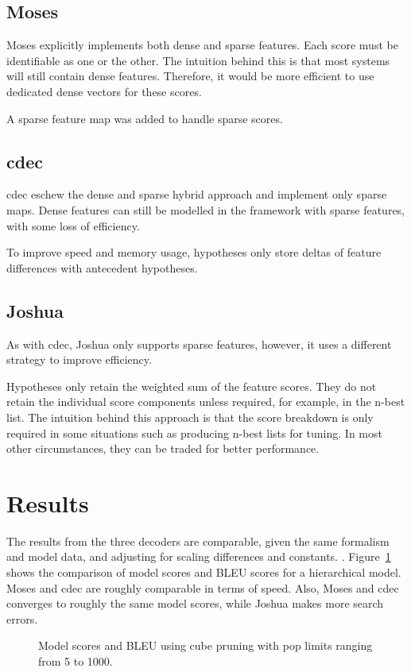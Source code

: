 \documentclass{pbml}
\begin{document}
\subsection{Moses}
Moses explicitly implements both dense and sparse features. Each score must be identifiable as one or the other.
The intuition behind this is that most systems will still contain dense features. Therefore, it would be more efficient to use dedicated dense vectors for these scores.

A sparse feature map was added to handle sparse scores.

\subsection{cdec}
cdec eschew the dense and sparse hybrid approach and implement only sparse maps. Dense features can still be modelled in the framework with sparse features, with some loss of efficiency.

To improve speed and memory usage, hypotheses only store deltas of feature differences with antecedent hypotheses.

\subsection{Joshua}
As with cdec, Joshua only supports sparse features, however, it uses a different strategy to improve efficiency.

Hypotheses only retain the weighted sum of the feature scores. They do not retain the individual score components unless required, for example, in the n-best list. The intuition behind this approach is that the score breakdown is only required in some situations such as producing n-best lists for tuning. In most other circumstances, they can be traded for better performance.
  
\section{Results}

The results from the three decoders are comparable, given the same formalism and model data, and adjusting for scaling differences and constants. . Figure~\ref{fig:model} shows the comparison of model scores and BLEU scores for a hierarchical model. Moses and cdec are roughly comparable in terms of speed. Also, Moses and cdec converges to roughly the same model scores, while Joshua makes more search errors. 

\begin{figure}

\caption{\label{fig:model}Model scores and BLEU using cube pruning with pop limits ranging from 5 to 1000.}
\end{figure} 
\end{document}
